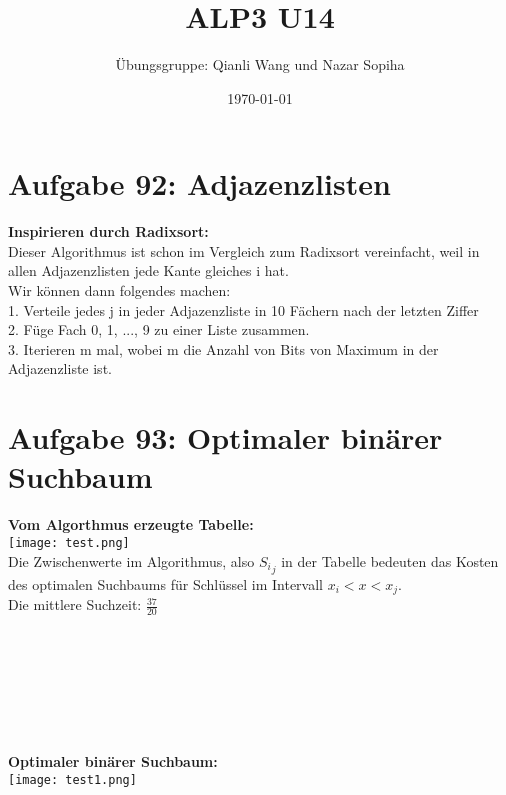 \documentclass{article}
\title{ALP3 U14}
\author{Übungsgruppe: Qianli Wang und Nazar Sopiha}
\date{\today}
\begin{document}
\maketitle

\section{Aufgabe 92: Adjazenzlisten}
\textbf{Inspirieren durch Radixsort:}\\
Dieser Algorithmus ist schon im Vergleich zum Radixsort vereinfacht, weil in allen Adjazenzlisten jede Kante gleiches i hat.\\
Wir können dann folgendes machen:\\
1. Verteile jedes j in jeder Adjazenzliste in 10 Fächern nach der letzten Ziffer  \\
2. Füge Fach 0, 1, ..., 9 zu einer Liste zusammen.\\
3. Iterieren m mal, wobei m die Anzahl von Bits von Maximum in der Adjazenzliste ist.

\section{Aufgabe 93: Optimaler binärer Suchbaum}
\textbf{Vom Algorthmus erzeugte Tabelle:}\\
\texttt{[image: test.png]}\\
Die Zwischenwerte im Algorithmus, also ${S_i}_j$ in der Tabelle bedeuten das Kosten des optimalen Suchbaums für Schlüssel im Intervall $x_i < x < x_j$. \\
Die mittlere Suchzeit: $\frac{37}{20}$\\
\\
\\
\\
\\
\\
\\
\\
\textbf{Optimaler binärer Suchbaum:}\\
\texttt{[image: test1.png]}\\
\end{document}
